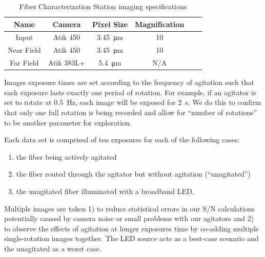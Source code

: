 \documentclass[twocolumn]{emulateapj}
\begin{document}
\begin{table}
\centering
\caption{Fiber Characterization Station imaging specifications}
	\begin{tabular}{cccccc}
	\hline
	Name & Camera & Pixel Size & Magnification \\
	\hline \hline
	Input & Atik 450 & \SI{3.45}{\micro\meter} & 10 \\
	\hline
	Near Field & Atik 450 & \SI{3.45}{\micro\meter} & 10 \\
	\hline
	Far Field & Atik 383L+ & \SI{5.4}{\micro\meter} & N/A \\
	\hline	
	\end{tabular}
\label{table:cameras}
\end{table}

Images exposure times are set according to the frequency of agitation such that each exposure lasts exactly one period of rotation. For example, if an agitator is set to rotate at \SI{0.5}{\hertz}, each image will be exposed for \SI{2}{\second}. We do this to confirm that only one full rotation is being recorded and allow for ``number of rotations'' to be another parameter for exploration.


Each data set is comprised of ten exposures for each of the following cases:
\begin{enumerate}
\item the fiber being actively agitated
\item the fiber routed through the agitator but without agitation (``unagitated'')
\item the unagitated fiber illuminated with a broadband LED.
\end{enumerate}
Multiple images are taken 1) to reduce statistical errors in our S/N calculations potentially caused by camera noise or small problems with our agitators and 2) to observe the effects of agitation at longer exposures time by co-adding multiple single-rotation images together. The LED source acts as a best-case scenario and the unagitated as a worst case.
\end{document}
